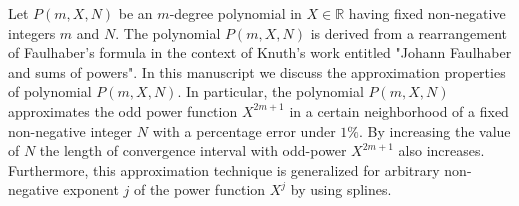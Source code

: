 Let $P(m, X, N)$ be an $m$-degree polynomial in $X\in\mathbb{R}$
having fixed non-negative integers $m$ and $N$.
The polynomial $P(m, X, N)$ is derived from a rearrangement of Faulhaber's formula
in the context of Knuth's work entitled "Johann Faulhaber and sums of powers".
In this manuscript we discuss the approximation properties of polynomial $P(m,X,N)$.
In particular, the polynomial $P(m,X,N)$ approximates the odd power function $X^{2m+1}$ in a certain neighborhood
of a fixed non-negative integer $N$ with a percentage error under $1\%$.
By increasing the value of $N$ the length of convergence interval with odd-power $X^{2m+1}$ also increases.
Furthermore, this approximation technique is generalized for arbitrary non-negative exponent $j$ of the power function $X^j$
by using splines.
